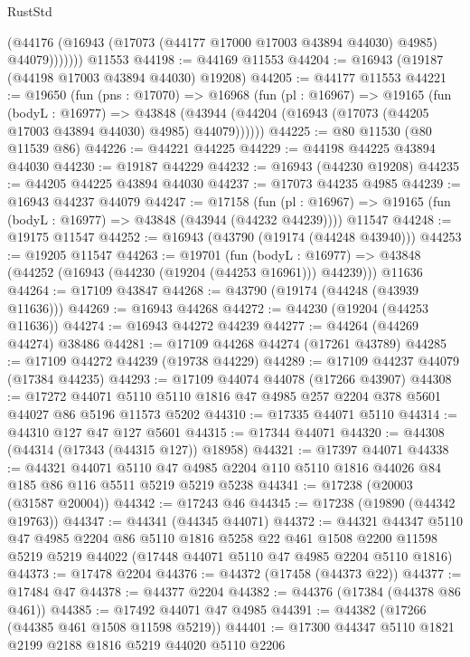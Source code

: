 \begin{lexlean}{RustStd}
\begin{coremodule}
              (@44176 (@16943 (@17073 (@44177 @17000 @17003 @43894 @44030) @4985) @44079)))))))
    @11553
@44198 := @44169 @11553
@44204 := @16943 (@19187 (@44198 @17003 @43894 @44030) @19208)
@44205 := @44177 @11553
@44221 := @19650
    (fun (pns : @17070) =>
    @16968
      (fun (pl : @16967) =>
      @19165
        (fun (bodyL : @16977) =>
        @43848 (@43944 (@44204 (@16943 (@17073 (@44205 @17003 @43894 @44030) @4985) @44079))))))
@44225 := @80 @11530 (@80 @11539 @86)
@44226 := @44221 @44225
@44229 := @44198 @44225 @43894 @44030
@44230 := @19187 @44229
@44232 := @16943 (@44230 @19208)
@44235 := @44205 @44225 @43894 @44030
@44237 := @17073 @44235 @4985
@44239 := @16943 @44237 @44079
@44247 := @17158
    (fun (pl : @16967) => @19165 (fun (bodyL : @16977) => @43848 (@43944 (@44232 @44239))))
    @11547
@44248 := @19175 @11547
@44252 := @16943 (@43790 (@19174 (@44248 @43940)))
@44253 := @19205 @11547
@44263 := @19701
    (fun (bodyL : @16977) => @43848 (@44252 (@16943 (@44230 (@19204 (@44253 @16961))) @44239)))
    @11636
@44264 := @17109 @43847
@44268 := @43790 (@19174 (@44248 (@43939 @11636)))
@44269 := @16943 @44268
@44272 := @44230 (@19204 (@44253 @11636))
@44274 := @16943 @44272 @44239
@44277 := @44264 (@44269 @44274) @38486
@44281 := @17109 @44268 @44274 (@17261 @43789)
@44285 := @17109 @44272 @44239 (@19738 @44229)
@44289 := @17109 @44237 @44079 (@17384 @44235)
@44293 := @17109 @44074 @44078 (@17266 @43907)
@44308 := @17272
    @44071
    @5110
    @5110
    @1816
    @47
    @4985
    @257
    @2204
    @378
    @5601
    @44027
    @86
    @5196
    @11573
    @5202
@44310 := @17335 @44071 @5110
@44314 := @44310 @127 @47 @127 @5601
@44315 := @17344 @44071
@44320 := @44308 (@44314 (@17343 (@44315 @127)) @18958)
@44321 := @17397 @44071
@44338 := @44321
    @44071
    @5110
    @47
    @4985
    @2204
    @110
    @5110
    @1816
    @44026
    @84
    @185
    @86
    @116
    @5511
    @5219
    @5219
    @5238
@44341 := @17238 (@20003 (@31587 @20004))
@44342 := @17243 @46
@44345 := @17238 (@19890 (@44342 @19763))
@44347 := @44341 (@44345 @44071)
@44372 := @44321
    @44347
    @5110
    @47
    @4985
    @2204
    @86
    @5110
    @1816
    @5258
    @22
    @461
    @1508
    @2200
    @11598
    @5219
    @5219
    @44022
    (@17448 @44071 @5110 @47 @4985 @2204 @5110 @1816)
@44373 := @17478 @2204
@44376 := @44372 (@17458 (@44373 @22))
@44377 := @17484 @47
@44378 := @44377 @2204
@44382 := @44376 (@17384 (@44378 @86 @461))
@44385 := @17492 @44071 @47 @4985
@44391 := @44382 (@17266 (@44385 @461 @1508 @11598 @5219))
@44401 := @17300 @44347 @5110 @1821 @2199 @2188 @1816 @5219 @44020 @5110 @2206

\end{coremodule}
\end{lexlean}
